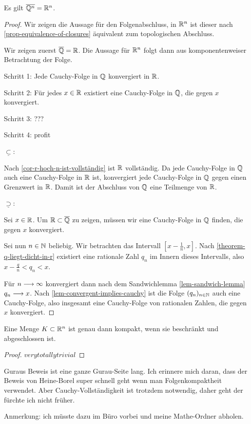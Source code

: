 \begin{corollary}
    Es gilt $\overline{\mathbb{Q}^n} = \mathbb{R}^n$.
\end{corollary}
\begin{proof}
    Wir zeigen die Aussage für den Folgenabschluss, in $\mathbb{R}^n$ ist dieser nach \ref{prop-equivalence-of-closures} äquivalent zum topologischen Abschluss.

    Wir zeigen zuerst $\overline{\mathbb{Q}} = \mathbb{R}$. Die Aussage für $\mathbb{R}^n$ folgt dann aus komponentenweiser Betrachtung der Folge.

    Schritt 1: Jede Cauchy-Folge in $\mathbb{Q}$ konvergiert in $\mathbb{R}$.
    
    Schritt 2: Für jedes $x \in \mathbb{R}$ existiert eine Cauchy-Folge in $\mathbb{Q}$, die gegen $x$ konvergiert.
    
    Schritt 3: ???
    
    Schritt 4: profit
    
    $\underline{\subset}$:

    Nach \ref{cor-r-hoch-n-ist-vollständig} ist $\mathbb{R}$ vollständig. Da jede Cauchy-Folge in $\mathbb{Q}$ auch eine Cauchy-Folge in $\mathbb{R}$ ist, konvergiert jede Cauchy-Folge in $\mathbb{Q}$ gegen einen Grenzwert in $\mathbb{R}$. Damit ist der Abschluss von $\mathbb{Q}$ eine Teilmenge von $\mathbb{R}$.

    $\underline{\supset}$:

    Sei $x \in \mathbb{R}$. Um $\mathbb{R} \subset \overline{\mathbb{Q}}$ zu zeigen, müssen wir eine Cauchy-Folge in $\mathbb{Q}$ finden, die gegen $x$ konvergiert.

    Sei nun $n \in \mathbb{N}$ beliebig. Wir betrachten das Intervall $[x - \frac{1}{n}, x]$. Nach \ref{theorem-q-liegt-dicht-in-r} existiert eine rationale Zahl $q_n$ im Innern dieses Intervalls, also $x - \frac{q}{n} < q_n < x$.

    Für $n \longrightarrow \infty$ konvergiert dann nach dem Sandwichlemma \ref{lem-sandwich-lemma} $q_n \longrightarrow x$. Nach \ref{lem-convergent-implies-cauchy} ist die Folge $(q_n)_{n \in \mathbb{N}}$ auch eine Cauchy-Folge, also insgesamt eine Cauchy-Folge von rationalen Zahlen, die gegen $x$ konvergiert.
\end{proof}

\begin{theorem}
    Eine Menge $K \subset \mathbb{R}^n$ ist genau dann kompakt, wenn sie beschränkt und abgeschlossen ist.
\end{theorem}
\begin{proof}
    $verytotallytrivial$
\end{proof}

Guraus Beweis ist eine ganze Gurau-Seite lang. Ich erinnere mich daran, dass der Beweis von Heine-Borel super schnell geht wenn man Folgenkompaktheit verwendet. Aber Cauchy-Vollständigkeit ist trotzdem notwendig, daher geht der fürchte ich nicht früher.

Anmerkung: ich müsste dazu im Büro vorbei und meine Mathe-Ordner abholen.